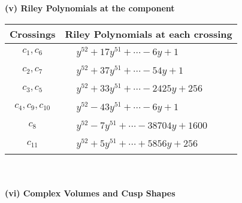 \documentclass[1p]{elsarticle_modified}
\theoremstyle{definition}
\begin{document}
\newpage\renewcommand{\arraystretch}{1}
\flushleft \textbf{(v) Riley Polynomials at the component}\newline \\
\begin{tabular}{m{50pt}|m{274pt}}
Crossings & \hspace{64pt}Riley Polynomials at each crossing \\
\hline $$\begin{aligned}c_{1},c_{6}\end{aligned}$$&$\begin{aligned}
&y^{52}+17 y^{51}+\cdots-6 y+1
\end{aligned}$\\
\hline $$\begin{aligned}c_{2},c_{7}\end{aligned}$$&$\begin{aligned}
&y^{52}+37 y^{51}+\cdots-54 y+1
\end{aligned}$\\
\hline $$\begin{aligned}c_{3},c_{5}\end{aligned}$$&$\begin{aligned}
&y^{52}+33 y^{51}+\cdots-2425 y+256
\end{aligned}$\\
\hline $$\begin{aligned}c_{4},c_{9},c_{10}\end{aligned}$$&$\begin{aligned}
&y^{52}-43 y^{51}+\cdots-6 y+1
\end{aligned}$\\
\hline $$\begin{aligned}c_{8}\end{aligned}$$&$\begin{aligned}
&y^{52}-7 y^{51}+\cdots-38704 y+1600
\end{aligned}$\\
\hline $$\begin{aligned}c_{11}\end{aligned}$$&$\begin{aligned}
&y^{52}+5 y^{51}+\cdots+5856 y+256
\end{aligned}$\\
\hline
\end{tabular}\\~\\
\newpage\flushleft \textbf{(vi) Complex Volumes and Cusp Shapes}
\end{document}
